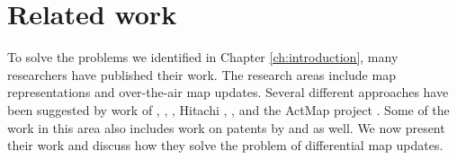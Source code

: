 

\chapter{Related work}\label{ch:relatedwork}

To solve the problems we identified in Chapter \ref{ch:introduction}, many researchers have published their work. The research areas include map representations and over-the-air map updates. Several different approaches have been suggested by work of \citet{min2008mobile}, \citet{asahara2008locally}, \citet{cooper2001incremental}, Hitachi \cite{hitachi},  \citet{bastiaensen2003actmap}, \citet{sakamoto2000proposal} and the ActMap project \cite{flament2003actmap}. Some of the work in this area also includes work on patents by \citet{kato2002method} and \citet{fischer2012technique} as well. We now present their work and discuss how they solve the problem of differential map updates.





